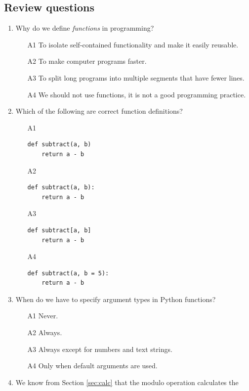 \subsection{Review questions}

\begin{enumerate}
\item Why do we define {\em functions} in programming? 
\begin{enumerate}
\item[A1] To isolate self-contained functionality and make it easily reusable.
\item[A2] To make computer programs faster.
\item[A3] To split long programs into multiple segments that have fewer lines.
\item[A4] We should not use functions, it is not a good programming practice.
\end{enumerate}
\item Which of the following are correct function definitions?
\begin{enumerate}
\item[A1] 
\begin{verbatim}
def subtract(a, b)
    return a - b
\end{verbatim}
\item[A2] 
\begin{verbatim}
def subtract(a, b):
    return a - b
\end{verbatim}
\item[A3] 
\begin{verbatim}
def subtract[a, b]
    return a - b
\end{verbatim}
\item[A4] 
\begin{verbatim}
def subtract(a, b = 5):
    return a - b
\end{verbatim}
\end{enumerate}
\item When do we have to specify argument types in Python functions?
\begin{enumerate}
\item[A1] Never.
\item[A2] Always.
\item[A3] Always except for numbers and text strings.
\item[A4] Only when default arguments are used.
\end{enumerate}
\item We know from Section \ref{sec:calc} that the modulo operation calculates the 

\end{enumerate}
